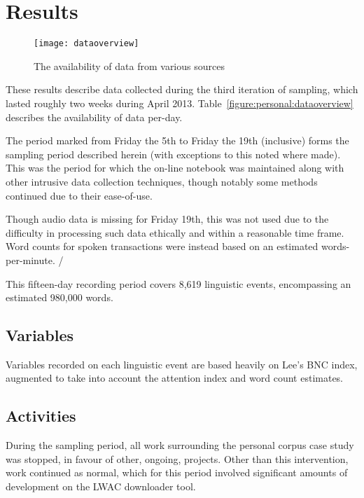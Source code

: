 \section{Results}

\begin{figure}[p]
\centering
\texttt{[image: dataoverview]}
\caption{The availability of data from various sources}
\label{fig:personal:dataoverview}
\end{figure}


These results describe data collected during the third iteration of sampling, which lasted roughly two weeks during April 2013.  Table~\ref{figure:personal:dataoverview} describes the availability of data per-day.

The period marked from Friday the 5th to Friday the 19th (inclusive) forms the sampling period described herein (with exceptions to this noted where made).  This was the period for which the on-line notebook was maintained along with other intrusive data collection techniques, though notably some methods continued due to their ease-of-use.

Though audio data is missing for Friday 19th, this was not used due to the difficulty in processing such data ethically and within a reasonable time frame.  Word counts for spoken transactions were instead based on an estimated words-per-minute.  /%

This fifteen-day recording period covers 8,619 linguistic events, encompassing an estimated 980,000 words.  



\subsection{Variables}
Variables recorded on each linguistic event are based heavily on Lee's BNC index, augmented to take into account the attention index and word count estimates.




\subsection{Activities}
During the sampling period, all work surrounding the personal corpus case study was stopped, in favour of other, ongoing, projects.  Other than this intervention, work continued as normal, which for this period involved significant amounts of development on the LWAC downloader tool.

